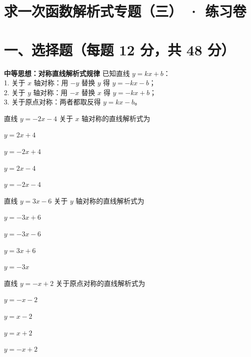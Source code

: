 \documentclass{exam-zh}
\begin{document}
\section*{求一次函数解析式专题（三） · 练习卷}

\section*{一、选择题（每题 12 分，共 48 分）}


\begin{keyideabox}
  \textbf{中等思想：对称直线解析式规律}
  已知直线 $y=kx+b$：\\ 1. 关于 $x$ 轴对称：用 $-y$ 替换 $y$ 得 $y = -kx - b$；\\ 2. 关于 $y$ 轴对称：用 $-x$ 替换 $x$ 得 $y = -kx + b$；\\ 3. 关于原点对称：两者都取反得 $y = kx - b$。
\end{keyideabox}



\begin{question}[points=12]
  直线 $y = -2x - 4$ 关于 $x$ 轴对称的直线解析式为
  \begin{choices}
    \item $y = 2x + 4$
    \item $y = -2x + 4$
    \item $y = 2x - 4$
    \item $y = -2x - 4$
  \end{choices}
\end{question}



\begin{question}[points=12]
  直线 $y = 3x - 6$ 关于 $y$ 轴对称的直线解析式为
  \begin{choices}
    \item $y = -3x + 6$
    \item $y = -3x - 6$
    \item $y = 3x + 6$
    \item $y = -3x$
  \end{choices}
\end{question}



\begin{question}[points=12]
  直线 $y = -x + 2$ 关于原点对称的直线解析式为
  \begin{choices}
    \item $y = -x - 2$
    \item $y = x - 2$
    \item $y = x + 2$
    \item $y = -x + 2$
  \end{choices}
\end{question}
\end{document}

